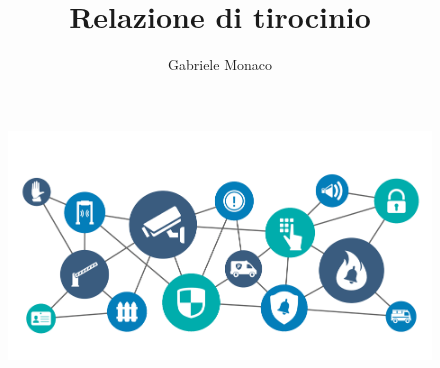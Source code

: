 \documentclass[a4paper,12pt]{article}
\title{Relazione di tirocinio}
\author{Gabriele Monaco}
\begin{document}
\maketitle

\begin{figure}[h]
  \includegraphics[width=\textwidth]{header}
\end{figure}

\newpage

\tableofcontents

\setlength{\emergencystretch}{7pt}
\setlength{\parindent}{0pt}

\newpage
\end{document}
